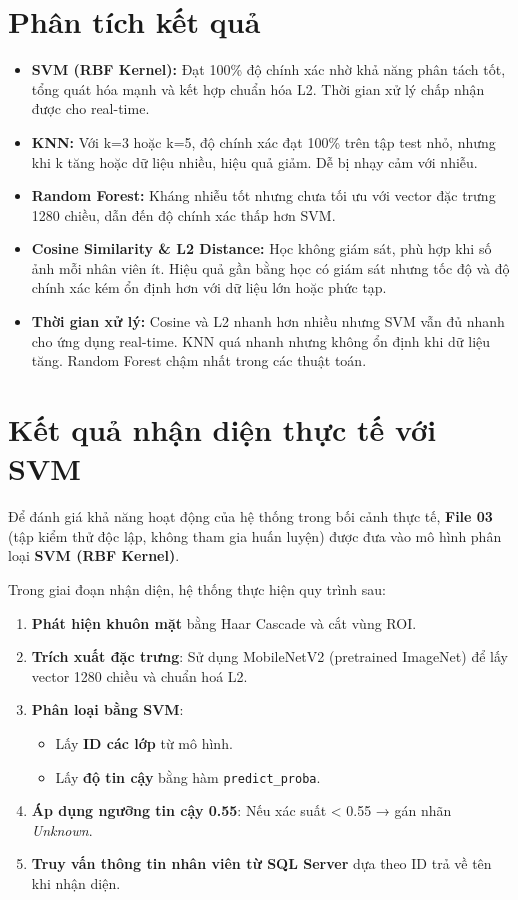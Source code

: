 \documentclass[a4paper]{book}
\begin{document}
\section{Phân tích kết quả}
\begin{itemize}
    \item \textbf{SVM (RBF Kernel):} Đạt 100\% độ chính xác nhờ khả năng phân tách tốt, tổng quát hóa mạnh và kết hợp chuẩn hóa L2. Thời gian xử lý chấp nhận được cho real-time.
    
    \item \textbf{KNN:} Với k=3 hoặc k=5, độ chính xác đạt 100\% trên tập test nhỏ, nhưng khi k tăng hoặc dữ liệu nhiều, hiệu quả giảm. Dễ bị nhạy cảm với nhiễu.
    
    \item \textbf{Random Forest:} Kháng nhiễu tốt nhưng chưa tối ưu với vector đặc trưng 1280 chiều, dẫn đến độ chính xác thấp hơn SVM.
    
    \item \textbf{Cosine Similarity \& L2 Distance:} Học không giám sát, phù hợp khi số ảnh mỗi nhân viên ít. Hiệu quả gần bằng học có giám sát nhưng tốc độ và độ chính xác kém ổn định hơn với dữ liệu lớn hoặc phức tạp.
    
    \item \textbf{Thời gian xử lý:} Cosine và L2 nhanh hơn nhiều nhưng SVM vẫn đủ nhanh cho ứng dụng real-time. KNN quá nhanh nhưng không ổn định khi dữ liệu tăng. Random Forest chậm nhất trong các thuật toán.
\end{itemize}
\section{Kết quả nhận diện thực tế với SVM}

Để đánh giá khả năng hoạt động của hệ thống trong bối cảnh thực tế, \textbf{File 03} (tập kiểm thử độc lập, không tham gia huấn luyện) được đưa vào mô hình phân loại \textbf{SVM (RBF Kernel)}. 

Trong giai đoạn nhận diện, hệ thống thực hiện quy trình sau:

\begin{enumerate}
    \item \textbf{Phát hiện khuôn mặt} bằng Haar Cascade và cắt vùng ROI.
    \item \textbf{Trích xuất đặc trưng}:  
    Sử dụng MobileNetV2 (pretrained ImageNet) để lấy vector 1280 chiều và chuẩn hoá L2.
    \item \textbf{Phân loại bằng SVM}:  
    \begin{itemize}
        \item Lấy \textbf{ID các lớp } từ mô hình.
        \item Lấy \textbf{độ tin cậy} bằng hàm \texttt{predict\_proba}.
    \end{itemize}
    \item \textbf{Áp dụng ngưỡng tin cậy 0.55}:  
    Nếu xác suất < 0.55 → gán nhãn \textit{Unknown}.
    \item \textbf{Truy vấn thông tin nhân viên từ SQL Server} dựa theo ID trả về tên khi nhận diện.
\end{enumerate}
\end{document}
